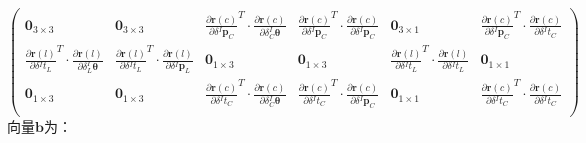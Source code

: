 \begin{equation*}
\begin{pmatrix}
    \boldsymbol{0}_{3\times 3}                                                             &
    \boldsymbol{0}_{3\times 3}                                                             &
    \frac{\partial \boldsymbol{r}(c)}{\partial \delta {^{I}\boldsymbol{p}_C}}^T
    \cdot\frac{\partial \boldsymbol{r}(c)}{\partial \delta {^{I}_{C}\boldsymbol{\theta}}}  &
    \frac{\partial \boldsymbol{r}(c)}{\partial \delta {^{I}\boldsymbol{p}_C}}^T
    \cdot\frac{\partial \boldsymbol{r}(c)}{\partial \delta {^{I}\boldsymbol{p}_C}}         &
    \boldsymbol{0}_{3\times 1}                                                             &
    \frac{\partial \boldsymbol{r}(c)}{\partial \delta {^{I}\boldsymbol{p}_C}}^T
    \cdot\frac{\partial \boldsymbol{r}(c)}{\partial \delta {^{I}t_{C}}}                      \\
    \frac{\partial \boldsymbol{r}(l)}{\partial \delta {^{I}t_{L}}}^T
    \cdot\frac{\partial \boldsymbol{r}(l)}{\partial \delta {^{I}_{L}\boldsymbol{\theta}}}  &
    \frac{\partial \boldsymbol{r}(l)}{\partial \delta {^{I}t_{L}}}^T
    \cdot\frac{\partial \boldsymbol{r}(l)}{\partial \delta {^{I}\boldsymbol{p}_L}}         &
    \boldsymbol{0}_{1\times 3}                                                             &
    \boldsymbol{0}_{1\times 3}                                                             &
    \frac{\partial \boldsymbol{r}(l)}{\partial \delta {^{I}t_{L}}}^T
    \cdot\frac{\partial \boldsymbol{r}(l)}{\partial \delta {^{I}t_{L}}}                    &
    \boldsymbol{0}_{1\times 1}                                                               \\
    \boldsymbol{0}_{1\times 3}                                                             &
    \boldsymbol{0}_{1\times 3}                                                             &
    \frac{\partial \boldsymbol{r}(c)}{\partial \delta {^{I}t_{C}}}^T
    \cdot\frac{\partial \boldsymbol{r}(c)}{\partial \delta {^{I}_{C}\boldsymbol{\theta}}}  &
    \frac{\partial \boldsymbol{r}(c)}{\partial \delta {^{I}t_{C}}}^T
    \cdot\frac{\partial \boldsymbol{r}(c)}{\partial \delta {^{I}\boldsymbol{p}_C}}         &
    \boldsymbol{0}_{1\times 1}                                                             &
    \frac{\partial \boldsymbol{r}(c)}{\partial \delta {^{I}t_{C}}}^T
    \cdot\frac{\partial \boldsymbol{r}(c)}{\partial \delta {^{I}t_{C}}}                      \\
  \end{pmatrix}
\end{equation*}
向量$\boldsymbol{b}$为：
